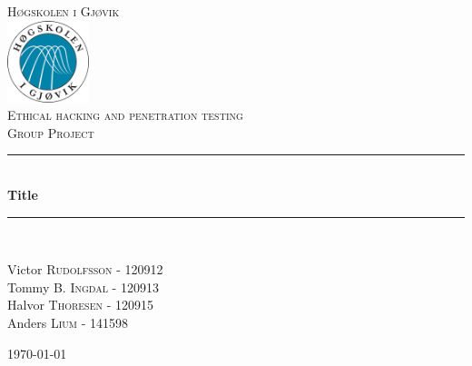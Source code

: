 \documentclass[12pt]{article} %
\begin{document}

\begin{titlepage}

\newcommand{\HRule}{\rule{\linewidth}{0.5mm}} %

\center %

\textsc{\LARGE Høgskolen i Gjøvik}\\[0.5cm] %
\includegraphics[width=90px, height=90px]{./Graphics/Hig-logo.png}\\[0.8cm] %
\textsc{\Large Ethical hacking and penetration testing}\\[0.5cm] %
\textsc{\large Group Project}\\[0.5cm] %

\HRule \\[0.4cm]
{ \huge \bfseries Title}\\[0.4cm] %
\HRule \\[1.5cm]

\begin{minipage}{0.44\textwidth}
\begin{flushleft} \large
Victor \textsc{Rudolfsson} - 120912\\ %
Tommy \textsc{B. Ingdal} - 120913\\ %
Halvor \textsc{Thoresen} - 120915\\ %
Anders \textsc{Lium} - 141598\\ %
\end{flushleft}
\end{minipage}

\vfill %
{\large \today}\\[3cm] %

\end{titlepage}
\end{document}
